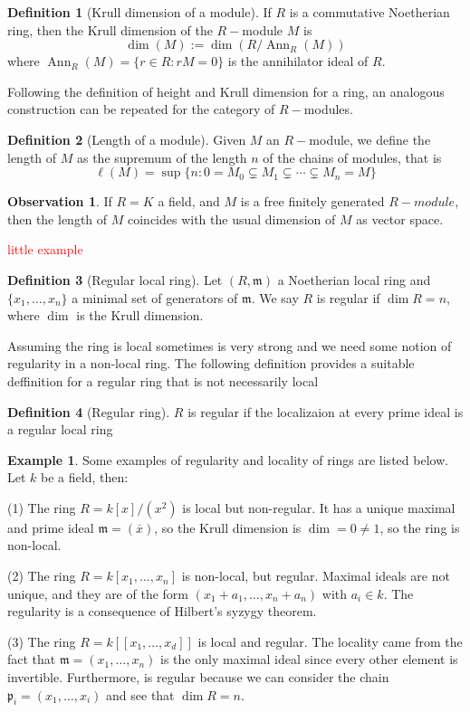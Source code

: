 \documentclass[leqno]{article}
\theoremstyle{definition}
\newtheorem{definition}{Definition}[section]
\newtheorem{observation}{Observation}[section]
\newtheorem{example}{Example}[section]
\DeclareMathOperator{\Ann}{Ann}
\newcommand{\com}[1]{\textcolor{red}{#1}}
\begin{document}
\begin{definition}[Krull dimension of a module] If  $R$ is a commutative Noetherian ring, then the Krull dimension of the  $R-$module  $M$ is
   \[
\dim(M) := \dim (R / \Ann _R(M))
  \] 
  where $\Ann_R(M) = \{r \in R : rM = 0\}$ is the annihilator ideal of $R$.
\end{definition}

Following the definition of height and Krull dimension for a ring, an analogous construction can be repeated for the category of $R-$modules.

\begin{definition}[Length of a module] Given $M$ an $R-$module, we define the length of  $M$ as the supremum of the length $n$ of the chains of modules, that is
  \[
	\ell(M)= \sup \{n: 0 = M_0\subsetneq M_1 \subsetneq \cdots \subsetneq M_n = M\}
  \] 

\end{definition}

\begin{observation} If $R = K$ a field, and $M$ is a free finitely generated $R-module$, then the length of  $M$ coincides with the usual dimension of $M$ as vector space.
\end{observation}

\com{little example}

\begin{definition}[Regular local ring] Let $(R, \mathfrak{m})$ a Noetherian local ring and $\{x_1, \ldots, x_n\}$ a minimal set of generators of $\mathfrak{m}$. We say $R$ is regular if $\dim R=n$, where  $\dim$ is the Krull dimension.
\end{definition}

Assuming the ring is local sometimes is very strong and we need some notion of regularity in a non-local ring. The following definition provides a suitable deffinition for a regular ring that is not necessarily local
\begin{definition}[Regular ring] $R$ is regular if the localizaion at every prime ideal is a regular local ring
\end{definition}

\begin{example} Some examples of regularity and locality of rings are listed below. Let $k$ be a field, then:

  (1) The ring $R = k[x] / (x^2)$ is local but non-regular. It has a unique maximal and prime ideal  $\mathfrak{m}=(\overline{x})$, so the Krull dimension is $\dim = 0\neq 1$, so the ring is non-local.

  (2) The ring $R = k[x_1, \ldots, x_n]$ is non-local, but regular. Maximal ideals are not unique, and they are of the form $(x_1+a_1, \ldots, x_n+a_n)$ with  $a_i\in k$. The regularity is a consequence of Hilbert's syzygy theorem.

  (3) The ring $R = k[[x_1, \ldots, x_d]]$ is local and regular. The locality came from the fact that $\mathfrak{m} = (x_1, \ldots, x_n)$ is the only maximal ideal since every other element is invertible. Furthermore, is regular because we can consider the chain $\mathfrak{p}_i = (x_1, \ldots, x_i)$ and see that $\dim R = n$.
\end{example}
\end{document}
